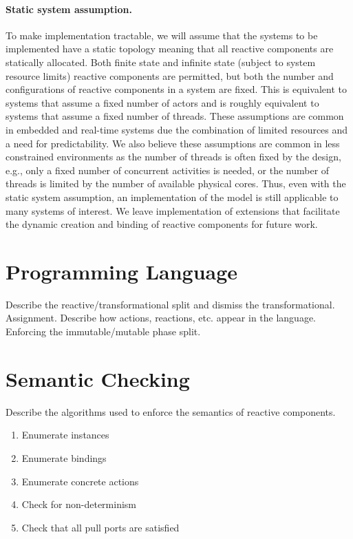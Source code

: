 \paragraph{Static system assumption.}
To make implementation tractable, we will assume that the systems to be implemented have a static topology meaning that all reactive components are statically allocated.
Both finite state and infinite state (subject to system resource limits) reactive components are permitted, but both the number and configurations of reactive components in a system are fixed.
This is equivalent to systems that assume a fixed number of actors and is roughly equivalent to systems that assume a fixed number of threads.
These assumptions are common in embedded and real-time systems due the combination of limited resources and a need for predictability.
We also believe these assumptions are common in less constrained environments as the number of threads is often fixed by the design, e.g., only a fixed number of concurrent activities is needed, or the number of threads is limited by the number of available physical cores.
Thus, even with the static system assumption, an implementation of the model is still applicable to many systems of interest.
We leave implementation of extensions that facilitate the dynamic creation and binding of reactive components for future work.

\section{Programming Language}
Describe the reactive/transformational split and dismiss the transformational.
Assignment.
Describe how actions, reactions, etc. appear in the language.
Enforcing the immutable/mutable phase split.

\section{Semantic Checking}
Describe the algorithms used to enforce the semantics of reactive components.
\begin{enumerate}
\item Enumerate instances
\item Enumerate bindings
\item Enumerate concrete actions
\item Check for non-determinism
\item Check that all pull ports are satisfied
\end{enumerate}

